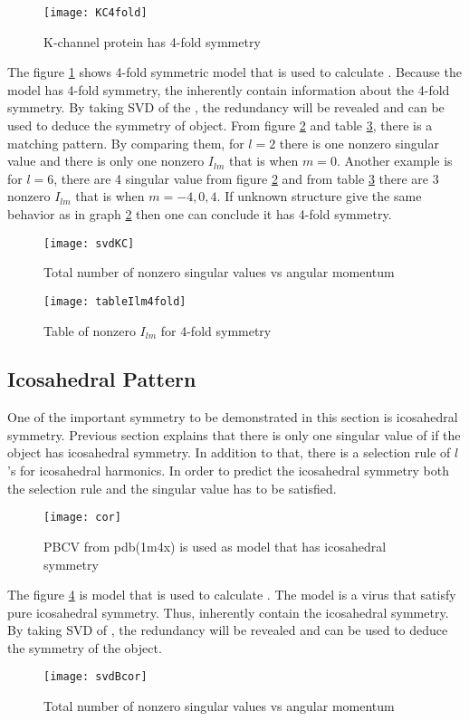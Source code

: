 \begin{figure}[ht]
  \centering
  \texttt{[image: KC4fold]}
\caption{K-channel protein has 4-fold symmetry}
\label{fig:KC4fold}
\end{figure}

The figure \ref{fig:KC4fold} shows 4-fold symmetric model that is used to calculate \Blq. 
Because the model has 4-fold symmetry, the \Blq inherently contain information about the 4-fold symmetry. 
By taking SVD of the \Blq, the redundancy will be revealed and can be used to deduce the symmetry of object. From figure \ref{fig:4foldsvd} and table \ref{fig:4foldtable}, there is a matching pattern. By comparing them, for $l=2$ there is one nonzero singular value and there is only one nonzero $I_{lm}$ that is when $m=0$. 
Another example is for $l=6$, there are 4 singular value from figure  \ref{fig:4foldsvd} and from table \ref{fig:4foldtable} there are 3 nonzero $I_{lm}$ that is when $m=-4,0,4$. If unknown structure give the same behavior as in graph \ref{fig:4foldsvd} then one can conclude it has 4-fold symmetry. 
\begin{figure}[h]
  \centering
  \texttt{[image: svdKC]}
\caption{Total number of nonzero singular values vs angular momentum}
\label{fig:4foldsvd}
\end{figure}
\begin{figure}[ht]
  \centering
  \texttt{[image: tableIlm4fold]}
\caption{Table of nonzero $I_{lm}$ for 4-fold symmetry}
\label{fig:4foldtable}
\end{figure}

\subsection{Icosahedral Pattern}
One of the important symmetry to be demonstrated in this section is icosahedral symmetry. Previous section explains that there is only one singular value of \Blq if the object has icosahedral symmetry.
 In addition to that, there is a selection rule of $l$'s for icosahedral harmonics. In order to predict the icosahedral symmetry both the selection rule and the singular value has to be satisfied. 
\begin{figure}[h!]
  \centering
  \texttt{[image: cor]}
\caption{PBCV from pdb(1m4x) is used as model that has icosahedral symmetry \cite{pdb1m4x}}
\label{fig:icopbcv}
\end{figure}

The figure \ref{fig:icopbcv} is model that is used to calculate \Blq. The model is a virus that satisfy pure icosahedral symmetry. Thus, \Blq inherently contain the icosahedral symmetry. By taking SVD of \Blq, the redundancy will be revealed and can be used to deduce the symmetry of the object.
\begin{figure}[h!]
  \centering
  \texttt{[image: svdBcor]}
\caption{Total number of nonzero singular values vs angular momentum}
\label{fig:svdico}
\end{figure}

